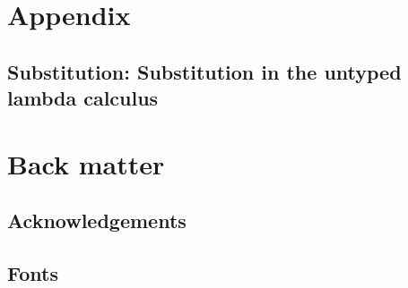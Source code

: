 \documentclass[10pt]{book}
\begin{document}

\part{Appendix}



\hypertarget{substitution}{%
  \chapter{Substitution: Substitution in the untyped lambda calculus}\label{substitution}}














\part{Back matter}



\hypertarget{acknowledgements}{%
  \chapter{Acknowledgements}\label{acknowledgements}}


\hypertarget{fonts}{%
  \chapter{Fonts}\label{fonts}}



\end{document}
